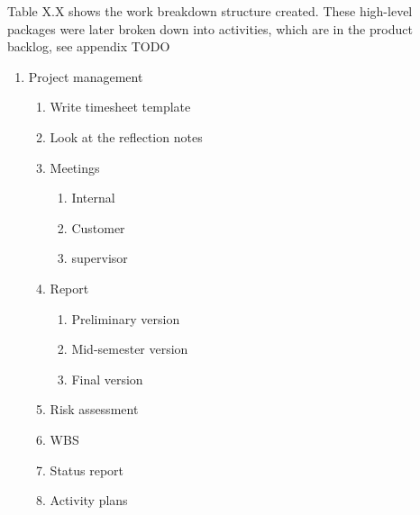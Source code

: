 Table X.X shows the work breakdown structure created. These high-level
packages were later broken down into activities, which are in the
product backlog, see appendix TODO

    \begingroup
    \fontsize{8pt}{5pt}\selectfont
\begin{mdframed}
    \begin{enumerate}
        \item Project management
        \begin{enumerate}
            \item Write timesheet template
            \item Look at the reflection notes
            \item Meetings
            \begin{enumerate}
                \item Internal
                \item Customer
                \item supervisor
            \end{enumerate}
            \item  Report
            \begin{enumerate}
                \item Preliminary version
                \item Mid-semester version
                \item Final version
            \end{enumerate}
            \item Risk assessment
            \item WBS
            \item Status report
            \item Activity plans
        \end{enumerate}


\end{enumerate}
\end{mdframed}

